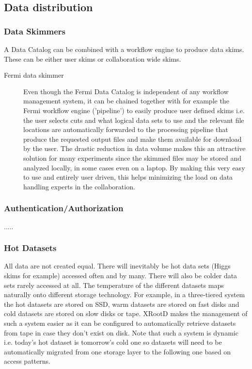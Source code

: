 \subsection{Data distribution}

\subsubsection{Data Skimmers}
A Data Catalog can be combined with a workflow engine to produce data skims. These can be either user skims or collaboration 
wide skims. 

\begin{description}
\item[Fermi data skimmer] Even though the Fermi Data Catalog is independent of any workflow management system, it 
can be chained together with for example the Fermi workflow engine ('pipeline') to easily produce user defined skims 
i.e. the user selects cuts and what logical data sets to use and the relevant file locations are automatically 
forwarded to the processing pipeline that produce the requested output files and make them available for download 
by the user. The drastic reduction in data volume makes this an attractive solution for many experiments since the skimmed files 
may be stored and analyzed locally, in some cases even on a laptop. By making this very easy to use and entirely user driven, this 
helps minimizing the load on data handling experts in the collaboration.    
\end{description}

\subsubsection{Authentication/Authorization} 
.....


\subsubsection{Hot Datasets}
All data are not created equal. There will inevitably be hot data sets (Higgs skims for example) accessed often and by 
many. There will also be colder data sets rarely accessed at all. The temperature of the different datasets maps  
naturally onto different storage technology. For example, in a three-tiered system the hot datasets are stored on SSD, 
warm datasets are stored on fast disks and cold datasets are stored on slow disks or tape. XRootD makes the 
management of such a system easier as it can be configured to automatically retrieve datasets from tape in case they 
don't exist on disk. Note that such a system is dynamic i.e. today's hot dataset is tomorrow's cold one so datasets will 
need to be automatically migrated from one storage layer to the following one based on access patterns. 




